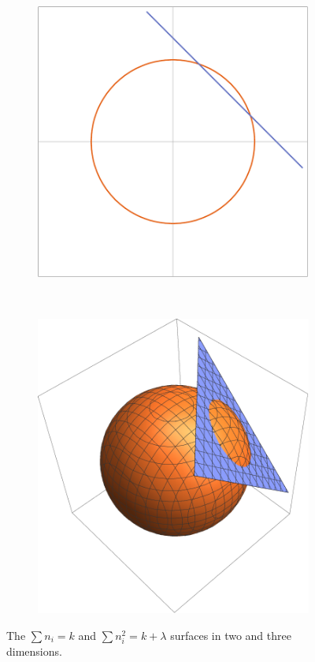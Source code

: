 \documentclass{article}
\theoremstyle{plain}
\theoremstyle{definition}
\theoremstyle{remark}
\begin{document}
		\begin{figure}
			\centering
			\begin{subfigure}[b]{0.5\textwidth}
				\includegraphics[width=\textwidth]{surfacesIn2D}
			\end{subfigure}%
			~
			\begin{subfigure}[b]{0.5\textwidth}
				\includegraphics[width=\textwidth]{surfacesIn3D}
			\end{subfigure}
			\caption{The $\sum {n_i} = k$ and $\sum n_i^2 = k + \lambda$ surfaces in two and three dimensions.}
			\label{general:figure:surfaces}
		\end{figure}
			
\end{document}
